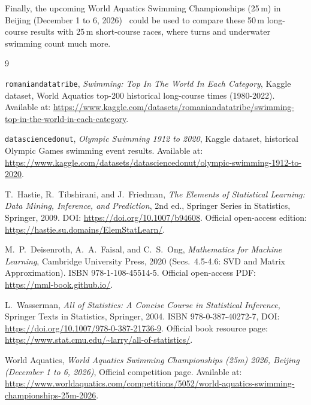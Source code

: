 \documentclass[11pt, a4paper]{article}
\begin{document}
\noindent Finally, the upcoming World Aquatics Swimming Championships (25\,m) in Beijing (December 1 to 6, 2026)~\cite{wa_beijing2026} could be used to compare these 50\,m long-course results with 25\,m short-course races, where turns and underwater swimming count much more.

\clearpage
{}
{}
\begin{thebibliography}{9}

\texttt{romaniandatatribe},
\textit{Swimming: Top In The World In Each Category},
Kaggle dataset, World Aquatics top-200 historical long-course times (1980-2022).
Available at: \url{https://www.kaggle.com/datasets/romaniandatatribe/swimming-top-in-the-world-in-each-category}.

\texttt{datasciencedonut},
\textit{Olympic Swimming 1912 to 2020},
Kaggle dataset, historical Olympic Games swimming event results.
Available at: \url{https://www.kaggle.com/datasets/datasciencedonut/olympic-swimming-1912-to-2020}.

T.~Hastie, R.~Tibshirani, and J.~Friedman,
\textit{The Elements of Statistical Learning: Data Mining, Inference, and Prediction},
2nd ed., Springer Series in Statistics, Springer, 2009.
DOI: \url{https://doi.org/10.1007/b94608}.
Official open-access edition: \url{https://hastie.su.domains/ElemStatLearn/}.

M.~P.~Deisenroth, A.~A.~Faisal, and C.~S.~Ong,
\textit{Mathematics for Machine Learning},
Cambridge University Press, 2020 (Secs.~4.5-4.6: SVD and Matrix Approximation).
ISBN 978-1-108-45514-5.
Official open-access PDF: \url{https://mml-book.github.io/}.

L.~Wasserman,
\textit{All of Statistics: A Concise Course in Statistical Inference},
Springer Texts in Statistics, Springer, 2004.
ISBN 978-0-387-40272-7, DOI: \url{https://doi.org/10.1007/978-0-387-21736-9}.
Official book resource page: \url{https://www.stat.cmu.edu/~larry/all-of-statistics/}.

World Aquatics,
\textit{World Aquatics Swimming Championships (25m) 2026, Beijing (December 1 to 6, 2026)},
Official competition page.
Available at: \url{https://www.worldaquatics.com/competitions/5052/world-aquatics-swimming-championships-25m-2026}.

\end{thebibliography}
\end{document}

